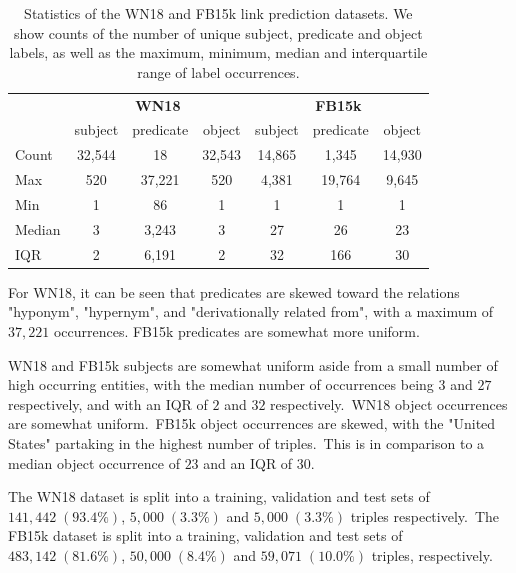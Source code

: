 \begin{table}
	\begin{center}
	\begin{tabular}{|l|ccc|ccc|}
		\hline
 		& \multicolumn{3}{c|}{\textbf{WN18}} & \multicolumn{3}{c|}{\textbf{FB15k}} \\
		& subject & predicate & object & subject & predicate & object \\
		\hline 
		Count & 32,544 & 18 & 32,543 & 14,865 & 1,345 & 14,930 \\
		Max & 520 & 37,221 & 520 & 4,381 & 19,764 & 9,645 \\
		Min & 1 & 86 & 1 & 1 & 1 & 1 \\
		Median & 3 & 3,243 & 3 & 27 & 26 & 23 \\
		IQR & 2 & 6,191 & 2 & 32 & 166 & 30 \\
		\hline 
	\end{tabular}
	\end{center}
	\captionsetup{justification=centering}
	\caption{Statistics of the WN18 and FB15k link prediction datasets. We show counts of the number of unique subject, predicate and object labels, as well as the maximum, minimum, median and interquartile range of label occurrences.}
\end{table}

\noindent For WN18, it can be seen that predicates are skewed toward the relations "hyponym",  "hypernym", and "derivationally related from", with a maximum of $ 37, 221 $ occurrences. FB15k predicates are somewhat more uniform. \par

\noindent WN18 and FB15k subjects are somewhat uniform aside from a small number of high occurring entities, with the median number of occurrences being $ 3 $ and $ 27 $ respectively, and with an IQR of $ 2 $ and $ 32 $ respectively.\ WN18 object occurrences are somewhat uniform.\ FB15k object occurrences are skewed, with the "United States" partaking in the highest number of triples.\ This is in comparison to a median object occurrence of $ 23 $ and an IQR of 30. \par

\noindent The WN18 dataset is split into a training, validation and test sets of $ 141, 442 \; (93.4 \%) $, $ 5, 000 \; (3.3 \%) $ and $ 5, 000 \; (3.3 \%) $ triples respectively.\ The FB15k dataset is split into a training, validation and test sets of $ 483, 142 \; (81.6 \%) $, $ 50, 000 \; (8.4 \%) $ and $ 59, 071 \; (10.0 \%) $ triples, respectively. 


